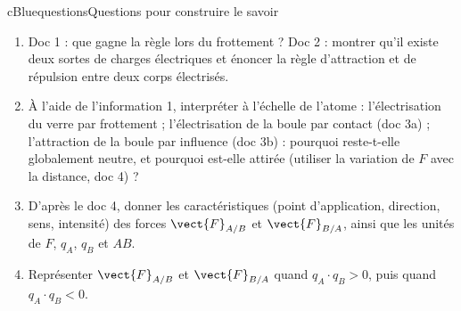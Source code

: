 \begin{rub}{cBlue}{questions}{Questions pour construire le savoir}
\begin{enumerate}
  \item {} Doc 1 : que gagne la règle lors du frottement ? Doc 2 : montrer qu’il existe deux sortes de charges électriques et énoncer la règle d’attraction et de répulsion entre deux corps électrisés.
  \item {} À l’aide de l’information 1, interpréter à l’échelle de l’atome : l’électrisation du verre par frottement ; l’électrisation de la boule par contact (doc 3a) ; l’attraction de la boule par influence (doc 3b) : pourquoi reste-t-elle globalement neutre, et pourquoi est-elle attirée (utiliser la variation de $F$ avec la distance, doc 4) ?
  \item {} D’après le doc 4, donner les caractéristiques (point d’application, direction, sens, intensité) des forces $\vect{F}_{A/B}$ et $\vect{F}_{B/A}$, ainsi que les unités de $F$, $q_A$, $q_B$ et $AB$.
  \item {} Représenter $\vect{F}_{A/B}$ et $\vect{F}_{B/A}$ quand $q_A\cdot q_B > 0$, puis quand $q_A\cdot q_B < 0$.
\end{enumerate}
\end{rub}


